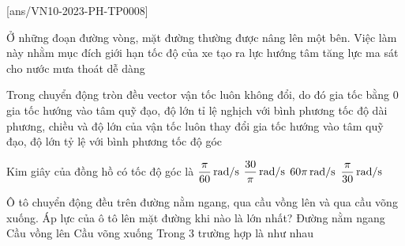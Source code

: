 \let\lesson\undefined
\newcommand{\lesson}{\phantomlesson{Ôn tập chương 8}}
\setcounter{ex}{0}
[ans/VN10-2023-PH-TP0008]
\begin{ex}
	Ở những đoạn đường vòng, mặt đường thường được nâng lên một bên. Việc làm này nhằm mục đích
	\choice
	{giới hạn tốc độ của xe}
	{\True tạo ra lực hướng tâm}
	{tăng lực ma sát}
	{cho nước mưa thoát dễ dàng}
	\loigiai{}
\end{ex}
\begin{ex}
	Trong chuyển động tròn đều
	\choice
	{vector vận tốc luôn không đổi, do đó gia tốc bằng 0}
	{gia tốc hướng vào tâm quỹ đạo, độ lớn tỉ lệ nghịch với bình phương tốc độ dài}
	{phương, chiều và độ lớn của vận tốc luôn thay đổi}
	{\True gia tốc hướng vào tâm quỹ đạo, độ lớn tỷ lệ với bình phương tốc độ góc}
\end{ex}
\begin{ex}
	Kim giây của đồng hồ có tốc độ góc là 
	\choice
	{$\xsi{\dfrac{\pi}{60}}{\radian/\second}$}
	{$\xsi{\dfrac{30}{\pi}}{\radian/\second}$}
	{$\xsi{60\pi}{\radian/\second}$}
	{\True $\xsi{\dfrac{\pi}{30}}{\radian/\second}$}
	\loigiai{}
\end{ex}
\begin{ex}
	Ô tô chuyển động đều trên đường nằm ngang, qua cầu vồng lên và qua cầu võng xuống. Áp lực của ô tô lên mặt đường khi nào là lớn nhất?
	\choice
	{Đường nằm ngang}
	{Cầu vồng lên}
	{\True Cầu võng xuống}
	{Trong 3 trường hợp là như nhau}
	\loigiai{}
\end{ex}

